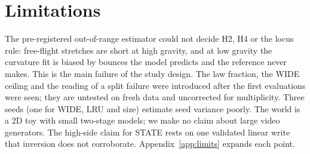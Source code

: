 \section{Limitations}
\label{sec:limits}

The pre-registered out-of-range estimator could not decide H2, H4 or the locus rule: free-flight
stretches are short at high gravity, and at low gravity the curvature fit is biased by bounces the
model predicts and the reference never makes. This is the main failure of the study design. The
law fraction, the WIDE ceiling and the reading of a split failure were introduced after the first
evaluations were seen; they are untested
on fresh data and uncorrected for multiplicity. Three seeds (one for WIDE, LRU and size) estimate
seed variance poorly. The world is a 2D toy with small two-stage models; we make no claim about
large video generators. The high-side claim for STATE rests on one validated linear write that
inversion does not corroborate. Appendix~\ref{app:limits} expands each point.
